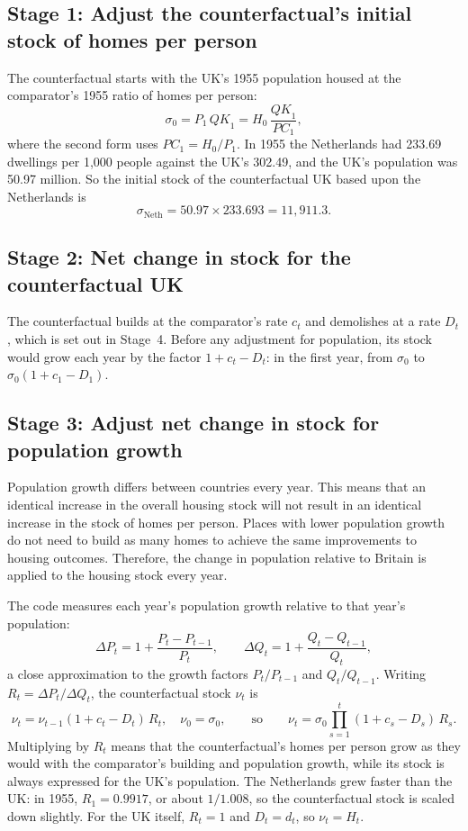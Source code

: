 \documentclass[11pt,a4paper]{article}
\newcommand{\PC}{\mathit{PC}}
\newcommand{\QK}{\mathit{QK}}
\begin{document}
\subsection*{Stage 1: Adjust the counterfactual's initial stock of homes per person}

The counterfactual starts with the UK's 1955 population housed at the comparator's 1955
ratio of homes per person:
\[
  \sigma_0 = P_1\,\QK_1 = H_0\,\frac{\QK_1}{\PC_1},
\]
where the second form uses $\PC_1 = H_0 / P_1$. In 1955 the Netherlands had 233.69
dwellings per 1,000 people against the UK's 302.49, and the UK's population was 50.97
million. So the initial stock of the counterfactual UK based upon the Netherlands is
\[
  \sigma_{\text{Neth}} = 50.97 \times 233.693 = 11{,}911.3.
\]

\subsection*{Stage 2: Net change in stock for the counterfactual UK}

The counterfactual builds at the comparator's rate $c_t$ and demolishes at a rate $D_t$,
which is set out in Stage~4. Before any adjustment for population, its stock would grow
each year by the factor $1 + c_t - D_t$: in the first year, from $\sigma_0$ to
$\sigma_0(1 + c_1 - D_1)$.

\subsection*{Stage 3: Adjust net change in stock for population growth}

Population growth differs between countries every year. This means that an identical
increase in the overall housing stock will not result in an identical increase in the
stock of homes per person. Places with lower population growth do not need to build as
many homes to achieve the same improvements to housing outcomes. Therefore, the change in
population relative to Britain is applied to the housing stock every year.

The code measures each year's population growth relative to that year's population:
\[
  \Delta P_t = 1 + \frac{P_t - P_{t-1}}{P_t}, \qquad
  \Delta Q_t = 1 + \frac{Q_t - Q_{t-1}}{Q_t},
\]
a close approximation to the growth factors $P_t/P_{t-1}$ and $Q_t/Q_{t-1}$. Writing
$R_t = \Delta P_t / \Delta Q_t$, the counterfactual stock $\nu_t$ is
\[
  \nu_t = \nu_{t-1}(1 + c_t - D_t)\,R_t, \quad \nu_0 = \sigma_0,
  \qquad\text{so}\qquad
  \nu_t = \sigma_0 \prod_{s=1}^{t} (1 + c_s - D_s)\,R_s.
\]
Multiplying by $R_t$ means that the counterfactual's homes per person grow as they would
with the comparator's building and population growth, while its stock is always expressed
for the UK's population. The Netherlands grew faster than the UK: in 1955,
$R_1 = 0.9917$, or about $1/1.008$, so the counterfactual stock is scaled down slightly.
For the UK itself, $R_t = 1$ and $D_t = d_t$, so $\nu_t = H_t$.
\end{document}
